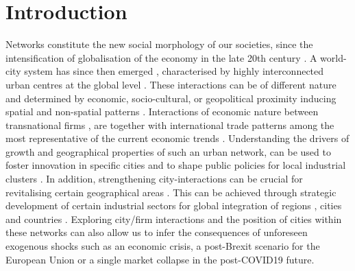 \documentclass[10pt,letterpaper]{article}
\begin{document}
\linenumbers



\section*{Introduction}

Networks constitute the new social morphology of our societies, since the intensification of globalisation of the economy in the late 20th century \cite{castells2000networksociety}. A world-city system has since then emerged \cite{taylor2001specification}, characterised by highly interconnected urban centres at the global level \cite{Sassen1991}. These interactions can be of different nature and determined by economic, socio-cultural, or geopolitical proximity inducing spatial and non-spatial patterns \cite{martinus2018global}. Interactions of economic nature between transnational firms \cite{derudder2018central}, are together with international trade patterns among the most representative of the current economic trends \cite{taylor2001specification}. Understanding the drivers of growth and geographical properties of such an urban network, can be used to foster innovation in specific cities and to shape public policies for local industrial clusters \cite{turkina2016structure}. In addition, strengthening city-interactions can be crucial for revitalising certain geographical areas \cite{Clarke2018}. This can be achieved through strategic development of certain industrial sectors for global integration of regions \cite{dawley2019creating}, cities \cite{gluckler2016relational} and countries \cite{martinus2019brokerage}. Exploring city/firm interactions \cite{storme2019introducing} and the position of cities within these networks \cite{gluckler2016relational} can also allow us to infer the consequences of unforeseen exogenous shocks such as an economic crisis, a post-Brexit scenario for the European Union or a single market collapse in the post-COVID19 future.
\end{document}
